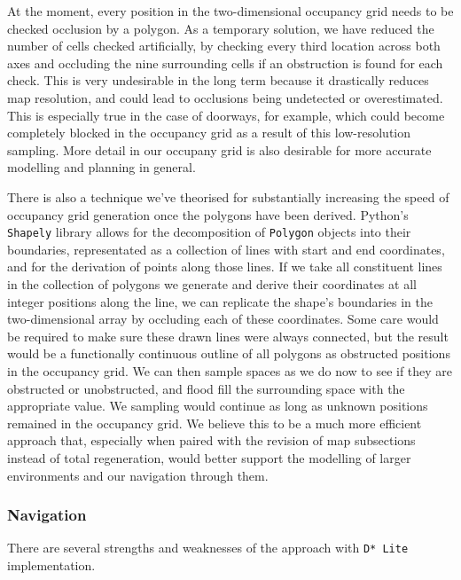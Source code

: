 \documentclass[10pt,english]{article}
\begin{document}
At the moment, every position in the two-dimensional occupancy grid needs to be checked occlusion by a polygon. As a temporary solution, we have reduced the number of cells checked artificially, by checking every third location across both axes and occluding the nine surrounding cells if an obstruction is found for each check. This is very undesirable in the long term because it drastically reduces map resolution, and could lead to occlusions being undetected or overestimated. This is especially true in the case of doorways, for example, which could become completely blocked in the occupancy grid as a result of this low-resolution sampling. More detail in our occupany grid is also desirable for more accurate modelling and planning in general.

There is also a technique we've theorised for substantially increasing the speed of occupancy grid generation once the polygons have been derived. Python's \texttt{Shapely} library allows for the decomposition of \texttt{Polygon} objects into their boundaries, representated as a collection of lines with start and end coordinates, and for the derivation of points along those lines. If we take all constituent lines in the collection of polygons we generate and derive their coordinates at all integer positions along the line, we can replicate the shape's boundaries in the two-dimensional array by occluding each of these coordinates. Some care would be required to make sure these drawn lines were always connected, but the result would be a functionally continuous outline of all polygons as obstructed positions in the occupancy grid. We can then sample spaces as we do now to see if they are obstructed or unobstructed, and flood fill the surrounding space with the appropriate value. We sampling would continue as long as unknown positions remained in the occupancy grid. We believe this to be a much more efficient approach that, especially when paired with the revision of map subsections instead of total regeneration, would better support the modelling of larger environments and our navigation through them.

\subsubsection*{Navigation}

There are several strengths and weaknesses of the approach with \texttt{D* Lite} implementation.
\end{document}
